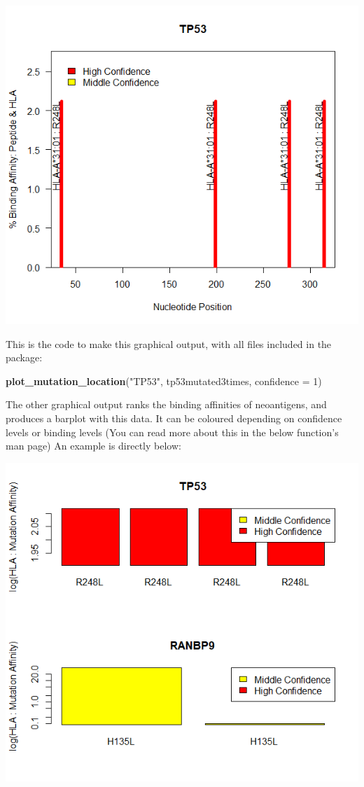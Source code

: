 \documentclass[
]{article}
\newenvironment{Shaded}{\begin{snugshade}}{\end{snugshade}}
\newcommand{\DataTypeTok}[1]{\textcolor[rgb]{0.13,0.29,0.53}{#1}}
\newcommand{\DecValTok}[1]{\textcolor[rgb]{0.00,0.00,0.81}{#1}}
\newcommand{\KeywordTok}[1]{\textcolor[rgb]{0.13,0.29,0.53}{\textbf{#1}}}
\newcommand{\NormalTok}[1]{#1}
\newcommand{\StringTok}[1]{\textcolor[rgb]{0.31,0.60,0.02}{#1}}
\begin{document}
\includegraphics{./inst/extdata/location_plot.png}

This is the code to make this graphical output, with all files included
in the package:

\begin{Shaded}
\begin{Highlighting}[]
\KeywordTok{plot_mutation_location}\NormalTok{(}\StringTok{"TP53"}\NormalTok{, tp53mutated3times, }\DataTypeTok{confidence =} \DecValTok{1}\NormalTok{)}
\end{Highlighting}
\end{Shaded}

The other graphical output ranks the binding affinities of neoantigens,
and produces a barplot with this data. It can be coloured depending on
confidence levels or binding levels (You can read more about this in the
below function's man page) An example is directly below:

\includegraphics{./inst/extdata/plotWithConfidence.png}
\end{document}
